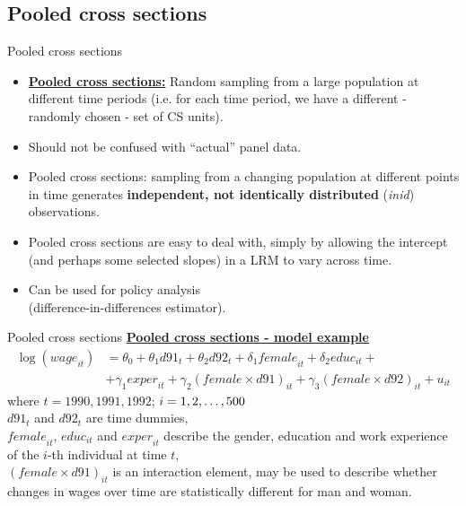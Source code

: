 \documentclass[usenames,dvipsnames]{beamer}
\newcommand{\mytikzmark}[2]{%
  \tikz[remember picture,inner sep=0pt,outer sep=0pt,baseline,anchor=base] 
    \node (#1) {\ensuremath{#2}};}
\begin{document}
\subsection*{Pooled cross sections}
\begin{frame}{Pooled cross sections}
\begin{itemize}
\item \underline{\textbf{Pooled cross sections:}}
Random sampling from a large population at different time periods (i.e. for each time period, we have a different - randomly chosen - set of CS units). 
\medskip
\item Should not be confused with ``actual'' panel data. 
\medskip
\item Pooled cross sections: sampling from a changing population at different points in time generates \textbf{independent, not identically distributed} (\textit{inid}) observations. 
\medskip
\item Pooled cross sections are easy to deal with, simply by allowing the intercept (and perhaps some selected slopes) in a LRM to vary across time. 
\medskip
\item Can be used for policy analysis \\(difference-in-differences estimator). 
\end{itemize}
\end{frame}
\begin{frame}{Pooled cross sections}
\underline{\textbf{Pooled cross sections - model example}}
\begin{align*}
\log(\textit{wage}_{it}) & = \theta_0 + \theta_1 d91_t + \theta_2 d92_t + \delta_1 \textit{female}_{it} + \delta_2 \textit{educ}_{it} +\\
& + \gamma_1 \textit{exper}_{it} + \gamma_2 (\textit{female} \times d91)_{it} + \gamma_3 (\textit{female} \times d92)_{it} + u_{it} 
\end{align*}
\medskip
where $t = 1990, 1991, 1992$; \hspace{0.2cm} $i=1,2, \dots , \mytikzmark{500}{500}$ \\
$d91_{t}$ and $d92_t$ are time dummies, \\
\vspace{0.2cm}
$\textit{female}_{it}$, $\textit{educ}_{it}$ and $\textit{exper}_{it}$ describe the gender, education and work experience of the $i$-th individual at time $t$, \\
\vspace{0.2cm}
$(\textit{female} \times d91)_{it}$ is an interaction element, may be used to describe whether changes in wages over time are statistically different for man and woman.
\end{frame}
\end{document}
